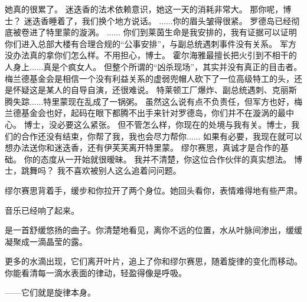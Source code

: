 \documentclass[openany]{book}
\begin{document}
\begin{dialogue}
     她真的很累了。
     迷迭香的法术依赖意识，她这一天的消耗非常大。
     那你呢，博士？
     迷迭香睡着了，我们换个地方说话。
     ......你的眉头皱得很紧。
     罗德岛已经彻底被卷进了特里蒙的漩涡。
     ......
     你们到莱茵生命是我安排的，我有证据可以证明你们进入总部大楼有合理合规的“公事安排”，与副总统遇刺事件没有关系。
     军方没办法真的拿你们怎么样。不用担心，博士。
     霍尔海雅最擅长把火引到不相干的人身上......真是个疯女人。
     但整个所谓的“凶杀现场”，其实并没有真正的目击者。
     梅兰德基金会是相信一个没有利益关系的虚弱兜帽人砍下了一位高级特工的头，还是怀疑这是某人的自导自演，还很难说。
     特莱顿工厂爆炸、副总统遇刺、克丽斯腾失踪......特里蒙现在乱成了一锅粥。
     虽然这么说有点不负责任，但军方也好，梅兰德基金会也好，起码在眼下都腾不出手来针对罗德岛，你们并不在漩涡的最中心。
     博士，没必要这么紧张。
     但不管怎么样，你现在的处境与我有关。博士，我们的合作还没有结束，你帮了我，我也会尽力帮你......
     如果有必要，我现在就可以想办法送你和迷迭香，还有伊芙芙离开特里蒙。
     缪尔赛思，真诚才是合作的基础。
     你的态度从一开始就很暧昧。
     我并不清楚，你这位合作伙伴的真实想法。
     博士，跳舞吗？
     我不喜欢被别人这么追着问问题。
\end{dialogue}\par

缪尔赛思背着手，缓步和你拉开了两个身位。她回头看你，表情难得地有些严肃。\par
音乐已经响了起来。\par
是一首舒缓悠扬的曲子。你清楚地看见，离你不远的位置，水从叶脉间渗出，缓缓凝聚成一滴晶莹的露。\par
更多的水滴出现，它们离开叶片，追上了你和缪尔赛思，随着旋律的变化而移动。你能看清每一滴水表面的律动，轻盈得像是呼吸。\par
——它们就是旋律本身。\par
\end{document}
